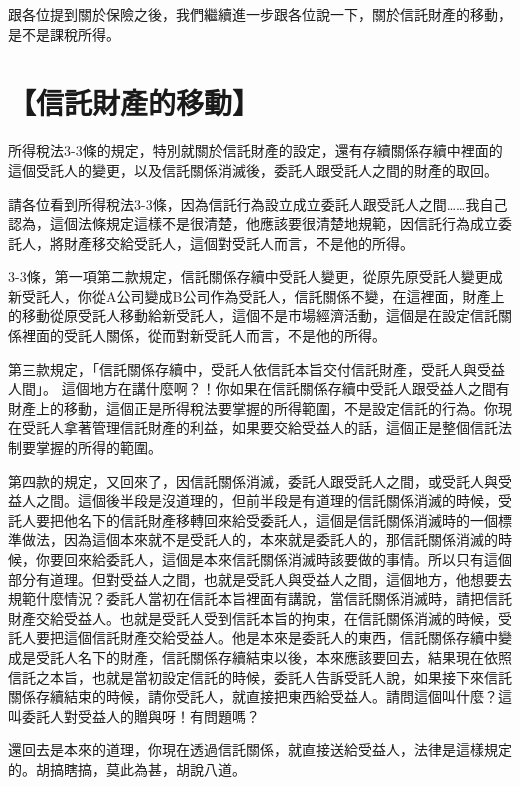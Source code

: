 \documentclass[]{ctexbook}
\begin{document}
跟各位提到關於保險之後，我們繼續進一步跟各位說一下，關於信託財產的移動，是不是課稅所得。

\hypertarget{ux4fe1ux8a17ux8ca1ux7522ux7684ux79fbux52d5}{%
\section{【信託財產的移動】}\label{ux4fe1ux8a17ux8ca1ux7522ux7684ux79fbux52d5}}

所得稅法3-3條的規定，特別就關於信託財產的設定，還有存續關係存續中裡面的這個受託人的變更，以及信託關係消滅後，委託人跟受託人之間的財產的取回。

請各位看到所得稅法3-3條，因為信託行為設立成立委託人跟受託人之間\ldots\ldots 我自己認為，這個法條規定這樣不是很清楚，他應該要很清楚地規範，因信託行為成立委託人，將財產移交給受託人，這個對受託人而言，不是他的所得。

3-3條，第一項第二款規定，信託關係存續中受託人變更，從原先原受託人變更成新受託人，你從A公司變成B公司作為受託人，信託關係不變，在這裡面，財產上的移動從原受託人移動給新受託人，這個不是市場經濟活動，這個是在設定信託關係裡面的受託人關係，從而對新受託人而言，不是他的所得。

第三款規定，「信託關係存續中，受託人依信託本旨交付信託財產，受託人與受益人間」。
這個地方在講什麼啊？！你如果在信託關係存續中受託人跟受益人之間有財產上的移動，這個正是所得稅法要掌握的所得範圍，不是設定信託的行為。你現在受託人拿著管理信託財產的利益，如果要交給受益人的話，這個正是整個信託法制要掌握的所得的範圍。

第四款的規定，又回來了，因信託關係消滅，委託人跟受託人之間，或受託人與受益人之間。這個後半段是沒道理的，但前半段是有道理的信託關係消滅的時候，受託人要把他名下的信託財產移轉回來給受委託人，這個是信託關係消滅時的一個標準做法，因為這個本來就不是受託人的，本來就是委託人的，那信託關係消滅的時候，你要回來給委託人，這個是本來信託關係消滅時該要做的事情。所以只有這個部分有道理。但對受益人之間，也就是受託人與受益人之間，這個地方，他想要去規範什麼情況？委託人當初在信託本旨裡面有講說，當信託關係消滅時，請把信託財產交給受益人。也就是受託人受到信託本旨的拘束，在信託關係消滅的時候，受託人要把這個信託財產交給受益人。他是本來是委託人的東西，信託關係存續中變成是受託人名下的財產，信託關係存續結束以後，本來應該要回去，結果現在依照信託之本旨，也就是當初設定信託的時候，委託人告訴受託人說，如果接下來信託關係存續結束的時候，請你受託人，就直接把東西給受益人。請問這個叫什麼？這叫委託人對受益人的贈與呀！有問題嗎？

還回去是本來的道理，你現在透過信託關係，就直接送給受益人，法律是這樣規定的。胡搞瞎搞，莫此為甚，胡說八道。
\end{document}
